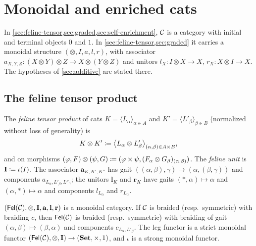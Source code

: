 \chapter{Monoidal and enriched cats}\label{ch:monoidal}

\begin{assumption}\label{ass:ch9}
In \cref{sec:feline-tensor,sec:graded,sec:self-enrichment}, $\mathcal{C}$ is a category
with initial and terminal objects $0$ and $1$. In \cref{sec:feline-tensor,sec:graded}
it carries a monoidal structure $(\otimes,I,a,l,r)$, with associator
$a_{X,Y,Z}\colon(X\otimes Y)\otimes Z\to X\otimes(Y\otimes Z)$ and unitors
$l_X\colon I\otimes X\to X$, $r_X\colon X\otimes I\to X$. The hypotheses of
\cref{sec:additive} are stated there.
\end{assumption}

\section{The feline tensor product}\label{sec:feline-tensor}

\begin{definition}\label{def:feline-tensor}
The \emph{feline tensor product} of cats $K=\langle L_\alpha\rangle_{\alpha\in A}$
and $K'=\langle L'_\beta\rangle_{\beta\in B}$ (normalized without loss of
generality) is
\[
K\otimes K'\coloneqq\bigl\langle L_\alpha\otimes L'_\beta\bigr\rangle_{(\alpha,\beta)\in A\times B},
\]
and on morphisms $(\varphi,F)\otimes(\psi,G)\coloneqq(\varphi\times\psi,(F_\alpha\otimes G_\beta)_{(\alpha,\beta)})$.
The \emph{feline unit} is $\mathbf I\coloneqq\iota(I)$. The associator
$\mathbf a_{K,K',K''}$ has gait $((\alpha,\beta),\gamma)\mapsto(\alpha,(\beta,\gamma))$
and components $a_{L_\alpha,L'_\beta,L''_\gamma}$; the unitors $\mathbf l_K$ and
$\mathbf r_K$ have gaits $(*,\alpha)\mapsto\alpha$ and $(\alpha,*)\mapsto\alpha$
and components $l_{L_\alpha}$ and $r_{L_\alpha}$.
\end{definition}

\begin{theorem}\label{thm:monoidal}
$(\mathsf{Fel}(\mathcal{C}),\otimes,\mathbf I,\mathbf a,\mathbf l,\mathbf r)$ is a monoidal
category. If $\mathcal{C}$ is braided (resp.\ symmetric) with braiding $c$, then
$\mathsf{Fel}(\mathcal{C})$ is braided (resp.\ symmetric) with braiding of gait
$(\alpha,\beta)\mapsto(\beta,\alpha)$ and components $c_{L_\alpha,L'_\beta}$.
The leg functor is a strict monoidal functor
$(\mathsf{Fel}(\mathcal{C}),\otimes,\mathbf I)\to(\mathbf{Set},\times,1)$, and $\iota$ is a strong
monoidal functor.
\end{theorem}

